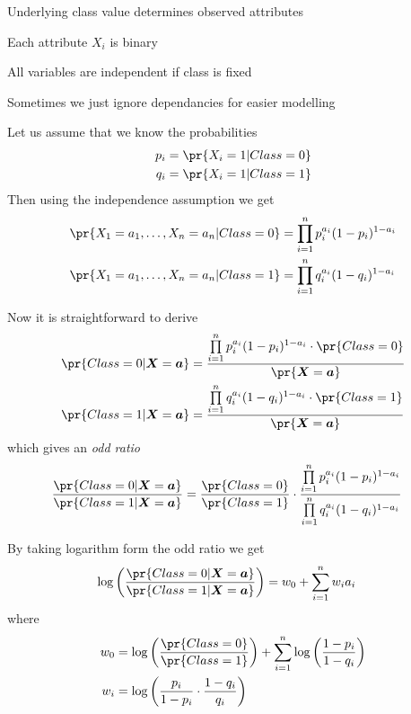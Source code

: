\documentclass[landscape,footrule]{foils}
\begin{document}


Underlying class value determines observed attributes 
\begin{triangles}
\item Each attribute $X_i$ is binary 
\item All variables are independent if class is fixed
\item Sometimes we just ignore dependancies for easier modelling
\end{triangles}


Let us assume that we know the probabilities
\begin{align*}
p_i&=\pr{X_i=1|Class=0}\\
q_i&=\pr{X_i=1|Class=1}
\end{align*}
Then using the independence assumption we get
\begin{align*}
\pr{X_1=a_1,\ldots,X_n=a_n|Class=0}&=\prod_{i=1}^np_i^{a_i}(1-p_i)^{1-a_i}\\
\pr{X_1=a_1,\ldots,X_n=a_n|Class=1}&=\prod_{i=1}^nq_i^{a_i}(1-q_i)^{1-a_i}
\end{align*}


\enlargethispage{1.5cm}
Now it is straightforward to derive
\begin{align*}
\pr{Class=0|\vec{X}=\vec{a}}&= \frac{\prod\limits_{i=1}^np_i^{a_i}(1-p_i)^{1-a_i}\cdot\pr{Class=0}}{\pr{\vec{X}=\vec{a}}}\\
\pr{Class=1|\vec{X}=\vec{a}}&= \frac{\prod\limits_{i=1}^nq_i^{a_i}(1-q_i)^{1-a_i}\cdot\pr{Class=1}}{\pr{\vec{X}=\vec{a}}}
\end{align*}
which gives an \emph{odd ratio} 
\begin{align*}
\frac{\pr{Class=0|\vec{X}=\vec{a}}}{\pr{Class=1|\vec{X}=\vec{a}}}&=\frac{\pr{Class=0}}{\pr{Class=1}}\cdot\frac{\prod\limits_{i=1}^np_i^{a_i}(1-p_i)^{1-a_i}}{\prod\limits_{i=1}^nq_i^{a_i}(1-q_i)^{1-a_i}}
\end{align*} 
 
 
By taking logarithm form the odd ratio we get
\begin{align*}
\log\left(\frac{\pr{Class=0|\vec{X}=\vec{a}}}{\pr{Class=1|\vec{X}=\vec{a}}}\right)&= w_0+\sum_{i=1}^n w_ia_i
\end{align*} 
where 
\begin{align*}
w_0&=\log\left(\frac{\pr{Class=0}}{\pr{Class=1}}\right)+\sum_{i=1}^n\log\left(\frac{1-p_i}{1-q_i}\right)\\
w_i&=\log \left(\frac{p_i}{1-p_i}\cdot\frac{1-q_i}{q_i}\right) 
\end{align*}
\end{document}
